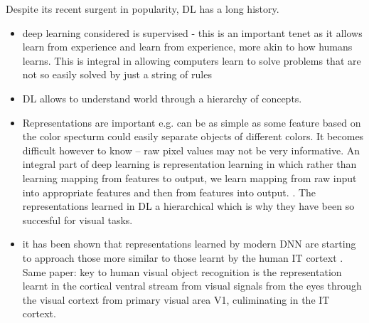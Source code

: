 \documentclass{report}
\begin{document}
Despite its recent surgent in popularity, DL has a long history.




\begin{itemize}
    \item deep learning considered is supervised - this is an important tenet as it allows learn from experience and learn from experience, more akin to how humans learns. This is integral in allowing computers learn to solve problems that are not so easily solved by just a string of rules
    \item DL allows to understand world through a hierarchy of concepts. 
    \item Representations are important e.g. can be as simple as some feature based on the color specturm could easily separate objects of different colors. It becomes difficult however to know -- raw pixel values may not be very informative. An integral part of deep learning is representation learning in which rather than learning mapping from features to output, we learn mapping from raw input into appropriate features and then from features into output. \cite{Goodfellow2016}. The representations learned in DL a hierarchical which is why they have been so succesful for visual tasks.
    \item it has been shown that representations learned by modern DNN are starting to approach those more similar to those learnt by the human IT cortext \cite{Cadieu2014}. Same paper: key to human visual object recognition is the representation learnt in the cortical ventral stream from visual signals from the eyes through the visual cortext from primary visual area V1, culiminating in the IT cortext. 
\end{itemize}



\end{document}
